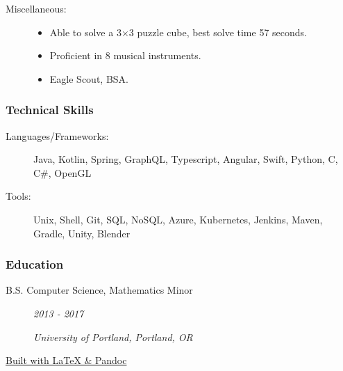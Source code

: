 \documentclass{article}
\begin{document}
\begin{description}
            \vspace{0.5em}

        \item[Miscellaneous:] \hfill
            \begin{itemize}
                \item Able to solve a 3$\times$3 puzzle cube, best solve time 57 seconds.
                \item Proficient in 8 musical instruments.
                \item Eagle Scout, BSA.
        \end{itemize}
    \end{description}


\subsubsection*{Technical Skills}
    \begin{description}    
        \item[Languages/Frameworks:] 
            Java, 
            Kotlin,
            Spring,
            GraphQL,
            Typescript,
            Angular,
            Swift,
            Python,
            C,
            C\#,
            OpenGL

            \vspace{0.5em}

        \item[Tools:] 
            Unix,
            Shell,
            Git,
            SQL,
            NoSQL,
            Azure,
            Kubernetes,
            Jenkins,
            Maven,
            Gradle,
            Unity,
            Blender
    \end{description}
    
\subsubsection*{Education}
    \begin{description}
        \item[B.S. Computer Science, Mathematics Minor]\hfill \textit{2013 - 2017}

        \textit{University of Portland, Portland, OR}


    \end{description}
    
    \begin{center}
	\vspace{.25in}
    \href{https://www.github.com/BurnsCommaLucas/Resume}{\small Built with \LaTeX \hspace{0.001in} \& Pandoc }
    \end{center}
\end{document}
